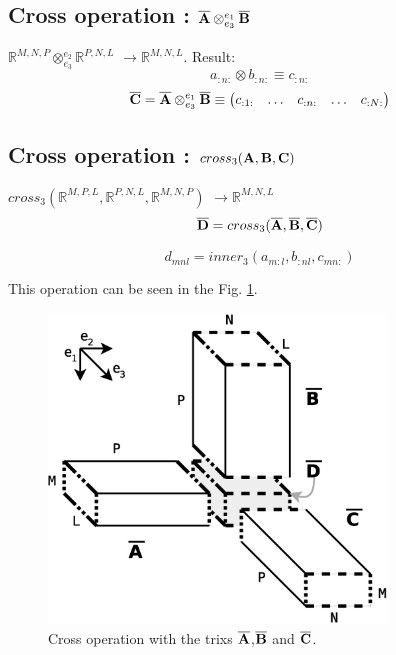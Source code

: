 \documentclass[11pt]{article}
\newcommand{\TRIX}[1]{\mathbf{\overline{\uppercase{#1}}}}
\newcommand{\MATRIX}[1]{\mathbf{\uppercase{#1}}}
\newcommand{\mulcross}{\otimes}
\newcommand{\dimsep}{,}
\newcommand{\mulcrosszy}{\mulcross_{e_3}^{e_2}}
\newcommand{\mulcrosszx}{\mulcross_{e_3}^{e_1}}
\newcommand{\funcmuliiinner}{inner_3 }
\newcommand{\funcmulcccross}{cross_3 }
\begin{document}
\subsection{Cross operation : $\TRIX{A} \mulcrosszx \TRIX{B}$}
$\mathbb{R}^{M\dimsep N\dimsep P}\mulcrosszy \mathbb{R}^{P \dimsep N\dimsep L}$ $\rightarrow \mathbb{R}^{M\dimsep N\dimsep L}$.
Result: 
  \begin{equation}
  a_{:n:}\mulcross b_{:n:} \equiv c_{:n:}
  \end{equation}
 \begin{equation}
\TRIX{C}=\TRIX{A} \mulcrosszx \TRIX{B} \equiv \left(
 \begin{matrix}
 c_{:1:}&\hdots&c_{:n:}&\hdots&c_{:N:}\\
 \end{matrix}
 \right)
\end{equation}
  
  
\subsection{Cross operation : $\funcmulcccross(\MATRIX{A},\MATRIX{B},\MATRIX{C})$}
$\funcmulcccross(\mathbb{R}^{M \dimsep P \dimsep L}, \mathbb{R}^{P \dimsep N \dimsep L}, \mathbb{R}^{M \dimsep N \dimsep P})$ 
$\rightarrow \mathbb{R}^{M\dimsep N\dimsep L}$
  \begin{equation}
\TRIX{D} = \funcmulcccross(\TRIX{A},\TRIX{B},\TRIX{C})
 \end{equation}
  
  \begin{equation}
d_{mnl} = \funcmuliiinner( a_{m:l},b_{:nl}, c_{mn:})
 \end{equation}
  
This operation can be seen in the Fig. \ref{fig:trixcross3C}.
  \begin{figure}[h]
  \centering
    \includegraphics[width=0.8\textwidth]{mulcross3}
    \caption{Cross operation with the trixs $\TRIX{A}$,$\TRIX{B}$ and $\TRIX{C}$.}
    \label{fig:trixcross3C}
\end{figure}
\end{document}
